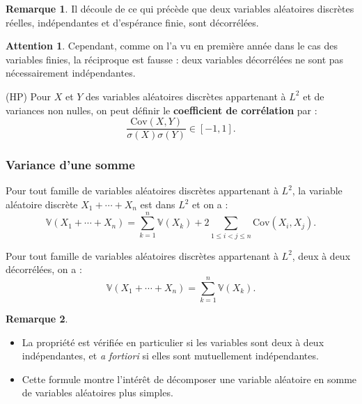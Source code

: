 \documentclass[french]{article}
\newcommand{\V}{\mathbb{V}}
\theoremstyle{plain}
\theoremstyle{definition}
\newtheorem*{rmq}{Remarque}
\newtheorem*{attention}{Attention}
\theoremstyle{remark}
\begin{document}
\begin{rmq}
	Il découle de ce qui précède que deux variables aléatoires discrètes réelles, indépendantes et d'espérance finie, sont décorrélées.
\end{rmq}

\begin{attention}
	Cependant, comme on l'a vu en première année dans le cas des variables finies, la réciproque est fausse : deux variables décorrélées ne sont pas nécessairement indépendantes.
\end{attention}

\begin{dfn}{(HP)}
	Pour $X$ et $Y$ des variables aléatoires discrètes appartenant à $L^2$ et de variances non nulles, on peut définir le \textbf{coefficient de corrélation} par :
	$$\frac{\text{Cov}(X,Y)}{\sigma(X)\sigma(Y)}\in[-1,1].$$
\end{dfn}

\subsubsection*{Variance d'une somme}

\begin{thm}{}%
	Pour tout famille de variables aléatoires discrètes appartenant à $L^2$, la variable aléatoire discrète $X_1+\cdots+X_n$ est dans $L^2$ et on a : $$\V(X_1+\cdots+X_n)=\sum_{k=1}^{n}\V(X_k)+2\sum_{1\leqslant i<j\leqslant n}\text{Cov}(X_i,X_j).$$
\end{thm}

\begin{thm}{}%
	Pour tout famille de variables aléatoires discrètes appartenant à $L^2$, deux à deux décorrélées, on a : 
	$$\V(X_1+\cdots+X_n)=\sum_{k=1}^{n}\V(X_k).$$
\end{thm}

\begin{rmq}
	\begin{itemize}
		\item La propriété est vérifiée en particulier si les variables sont deux à deux indépendantes, et \textit{a fortiori} si elles sont mutuellement indépendantes.
		\item Cette formule montre l'intérêt de décomposer une variable aléatoire en somme de variables aléatoires plus simples.
	\end{itemize}
\end{rmq}
\end{document}
